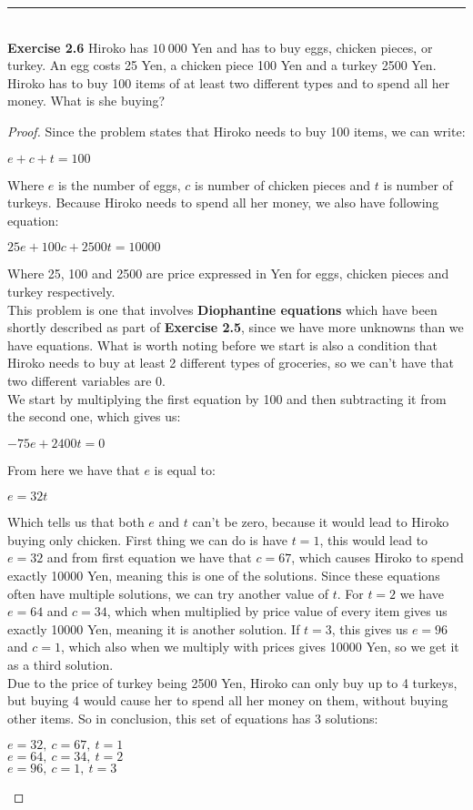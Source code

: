 \documentclass[a4paper]{article}
\begin{document}
\noindent\rule{12cm}{0.4pt}\\
\noindent \textbf{Exercise 2.6} Hiroko has $10\ 000$ Yen and has to buy eggs, chicken pieces, or turkey. An egg costs 25 Yen, a chicken piece 100 Yen and a turkey 2500 Yen. Hiroko has to buy 100 items of at least two different types and to spend all her money. What is she buying?
\begin{proof}
Since the problem states that Hiroko needs to buy 100 items, we can write:
\begin{center}
$e+c+t = 100$	
\end{center}
Where $e$ is the number of eggs, $c$ is number of chicken pieces and $t$ is number of turkeys. Because Hiroko needs to spend all her money, we also have following equation:
\begin{center}
$25e+100c+2500t=10000$	
\end{center}
Where 25, 100 and 2500 are price expressed in Yen for eggs, chicken pieces and turkey respectively.\\
This problem is one that involves \textbf{Diophantine equations} which have been shortly described as part of \textbf{Exercise 2.5}, since we have more unknowns than we have equations. What is worth noting before we start is also a condition that Hiroko needs to buy at least 2 different types of groceries, so we can't have that two different variables are 0.\\
We start by multiplying the first equation by 100 and then subtracting it from the second one, which gives us:
\begin{center}
$-75e+2400t = 0$	
\end{center}
From here we have that $e$ is equal to:
\begin{center}
$e = 32t$	
\end{center}
Which tells us that both $e$ and $t$ can't be zero, because it would lead to Hiroko buying only chicken. First thing we can do is have $t=1$, this would lead to $e=32$ and from first equation we have that $c=67$, which causes Hiroko to spend exactly 10000 Yen, meaning this is one of the solutions. Since these equations often have multiple solutions, we can try another value of $t$. For $t=2$ we have $e=64$ and $c=34$, which when multiplied by price value of every item gives us exactly 10000 Yen, meaning it is another solution. If $t=3$, this gives us $e=96$ and $c=1$, which also when we multiply with prices gives 10000 Yen, so we get it as a third solution.\\
Due to the price of turkey being 2500 Yen, Hiroko can only buy up to 4 turkeys, but buying 4 would cause her to spend all her money on them, without buying other items. So in conclusion, this set of equations has 3 solutions:
\begin{center}
$e=32,\ c=67,\ t=1$\\
$e=64,\ c=34,\ t=2$\\
$e=96,\ c=1,\ t=3$	
\end{center}
\end{proof}
\end{document}
